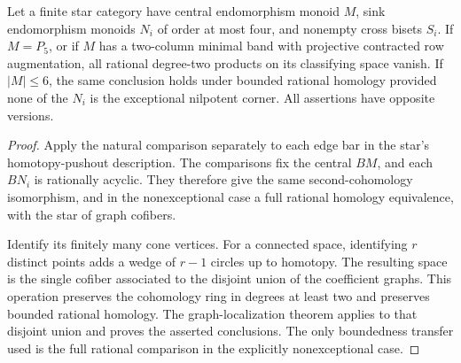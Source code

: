 \begin{corollary}
\label{C:small-opposite-graph-stars}
Let a finite star category have central endomorphism
monoid $M$, sink endomorphism monoids $N_i$ of order at
most four, and nonempty cross bisets $S_i$.  If $M=P_5$,
or if $M$ has a two-column minimal band with projective
contracted row augmentation, all rational degree-two
products on its classifying space vanish.  If $|M|\leq6$,
the same conclusion holds under bounded rational
homology provided none of the $N_i$ is the exceptional
nilpotent corner.  All assertions have opposite versions.
\end{corollary}
\begin{proof}
Apply the natural comparison separately to each edge
bar in the star's homotopy-pushout description.  The
comparisons fix the central $BM$, and each $BN_i$ is
rationally acyclic.  They therefore give the same
second-cohomology isomorphism, and in the nonexceptional
case a full rational homology equivalence, with the
star of graph cofibers.

Identify its finitely many cone vertices.  For a connected
space, identifying $r$ distinct points adds a wedge of
$r-1$ circles up to homotopy.  The resulting space is
the single cofiber associated to the disjoint union
of the coefficient graphs.  This operation preserves
the cohomology ring in degrees at least two and preserves
bounded rational homology.  The graph-localization
theorem applies to that disjoint union and proves
the asserted conclusions.  The only boundedness transfer
used is the full rational comparison in the explicitly
nonexceptional case.
\end{proof}
